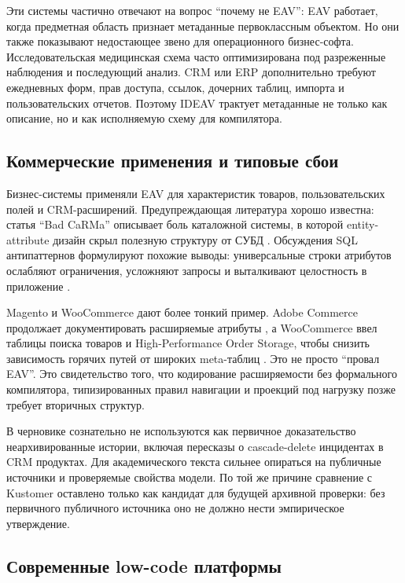 \documentclass[11pt]{article}
\begin{document}
Эти системы частично отвечают на вопрос ``почему не EAV'': EAV работает, когда
предметная область признает метаданные первоклассным объектом. Но они также
показывают недостающее звено для операционного бизнес-софта. Исследовательская
медицинская схема часто оптимизирована под разреженные наблюдения и последующий
анализ. CRM или ERP дополнительно требуют ежедневных форм, прав доступа, ссылок,
дочерних таблиц, импорта и пользовательских отчетов. Поэтому IDEAV трактует
метаданные не только как описание, но и как исполняемую схему для компилятора.

\subsection{Коммерческие применения и типовые сбои}

Бизнес-системы применяли EAV для характеристик товаров, пользовательских полей и
CRM-расширений. Предупреждающая литература хорошо известна: статья ``Bad
CaRMa'' описывает боль каталожной системы, в которой entity-attribute дизайн
скрыл полезную структуру от СУБД \citep{gorman2006badcarma}. Обсуждения SQL
антипаттернов формулируют похожие выводы: универсальные строки атрибутов
ослабляют ограничения, усложняют запросы и выталкивают целостность в приложение
\citep{karwin2010sql}.

Magento и WooCommerce дают более тонкий пример. Adobe Commerce продолжает
документировать расширяемые атрибуты \citep{adobeCommerceAttributes}, а
WooCommerce ввел таблицы поиска товаров и High-Performance Order Storage, чтобы
снизить зависимость горячих путей от широких meta-таблиц
\citep{woocommerceLookup,woocommerceHPOS}. Это не просто ``провал EAV''. Это
свидетельство того, что кодирование расширяемости без формального компилятора,
типизированных правил навигации и проекций под нагрузку позже требует вторичных
структур.

В черновике сознательно не используются как первичное доказательство
неархивированные истории, включая пересказы о cascade-delete инцидентах в CRM
продуктах. Для академического текста сильнее опираться на публичные источники и
проверяемые свойства модели.
По той же причине сравнение с Kustomer оставлено только как кандидат для будущей
архивной проверки: без первичного публичного источника оно не должно нести
эмпирическое утверждение.

\subsection{Современные low-code платформы}
\end{document}
